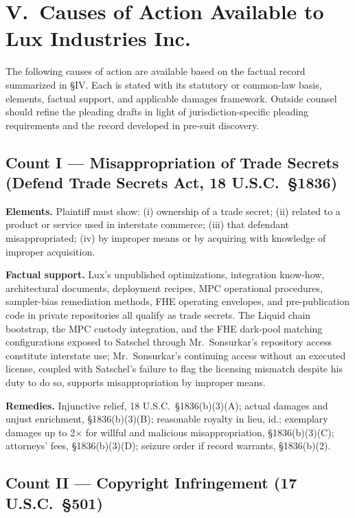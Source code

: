 \documentclass[11pt,letterpaper]{article}
\begin{document}
\section*{V.\ Causes of Action Available to Lux Industries Inc.}

The following causes of action are available based on the factual
record summarized in \S IV. Each is stated with its statutory or
common-law basis, elements, factual support, and applicable damages
framework. Outside counsel should refine the pleading drafts in
light of jurisdiction-specific pleading requirements and the
record developed in pre-suit discovery.

\subsection*{Count I --- Misappropriation of Trade Secrets (Defend
Trade Secrets Act, 18 U.S.C.\ \S 1836)}

\textbf{Elements.} Plaintiff must show: (i) ownership of a trade
secret; (ii) related to a product or service used in interstate
commerce; (iii) that defendant misappropriated; (iv) by improper
means or by acquiring with knowledge of improper acquisition.

\textbf{Factual support.} Lux's unpublished optimizations, integration
know-how, architectural documents, deployment recipes, MPC operational
procedures, sampler-bias remediation methods, FHE operating envelopes,
and pre-publication code in private repositories all qualify as trade
secrets. The Liquid chain bootstrap, the MPC custody integration, and
the FHE dark-pool matching configurations exposed to Satschel through
Mr.\ Sonsurkar's repository access constitute interstate use; Mr.\
Sonsurkar's continuing access without an executed license, coupled
with Satschel's failure to flag the licensing mismatch despite his
duty to do so, supports misappropriation by improper means.

\textbf{Remedies.} Injunctive relief, 18 U.S.C.\ \S 1836(b)(3)(A);
actual damages and unjust enrichment, \S 1836(b)(3)(B); reasonable
royalty in lieu, id.; exemplary damages up to 2$\times$ for willful
and malicious misappropriation, \S 1836(b)(3)(C); attorneys' fees,
\S 1836(b)(3)(D); seizure order if record warrants, \S 1836(b)(2).

\subsection*{Count II --- Copyright Infringement (17 U.S.C.\ \S 501)}
\end{document}

